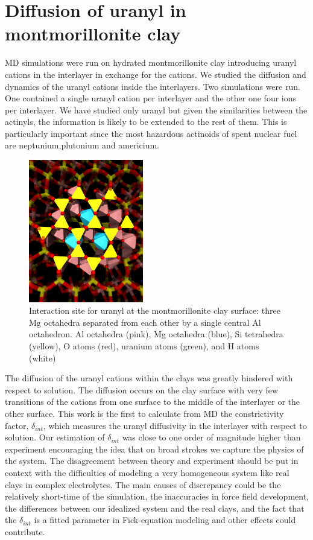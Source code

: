 \section[Diffusion of uranyl in montmorillonite clay]{Diffusion of uranyl in montmorillonite 
clay}

MD simulations were run on hydrated montmorillonite clay introducing uranyl cations 
in the interlayer in exchange for the  cations. We studied the diffusion and dynamics of 
the uranyl cations inside the interlayers. Two simulations were run. One contained a single 
uranyl cation 
per interlayer and the other one four ions per interlayer. 
We have studied only uranyl 
but given the similarities between the actinyls, the information is likely to be extended to 
the rest of them. This is particularly important since the most hazardous actinoids of spent 
nuclear 
fuel are neptunium,plutonium and americium.

\begin{figure}
\centering 
\includegraphics[width=5cm]{./images/site.png}
\caption[Strong interaction site for uranyl]{Interaction site for uranyl at the 
montmorillonite clay surface: three Mg octahedra 
separated from each other by a single central Al octahedron. Al 
octahedra (pink), Mg octahedra (blue), Si tetrahedra (yellow), O atoms (red), uranium atoms 
(green), and H atoms (white) 
}
\label{site}
\end{figure}

The diffusion of the uranyl cations within the clays was greatly hindered with respect to solution. 
The diffusion occurs 
on the clay surface with very few transitions of the cations from one surface to the middle of the 
interlayer or the other surface. This work is the first to calculate from MD the 
constrictivity factor,
$\delta_{int}$, which measures the uranyl diffusivity in the interlayer with respect to 
solution. Our estimation of $\delta_{int}$ was close to one order of magnitude higher than 
experiment\cite{TaiMine_Moore_2011} encouraging the idea that on broad strokes 
we capture the physics of the system. The disagreement between theory and experiment should be put 
in context with the difficulties of modeling a very homogeneous system like real clays in 
complex electrolytes. The main causes of  discrepancy could be the 
relatively short-time of the simulation, the inaccuracies in force field development, the 
differences between our idealized system and the real clays, and the fact that the $\delta_{int}$ 
is a fitted parameter in Fick-equation modeling and other effects could contribute. 

